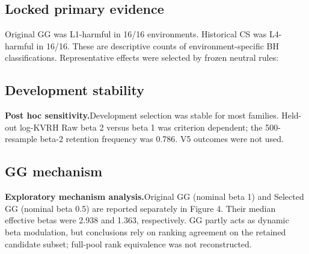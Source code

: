\documentclass[10pt]{article}
\newcommand{\evidencelabel}[1]{\textbf{#1}\enspace}
\begin{document}
\subsection{Locked primary evidence}
Original GG was L1-harmful in 16/16 environments. Historical CS was L4-harmful in 16/16. These are descriptive counts of environment-specific BH classifications. Representative effects were selected by frozen neutral rules:
\begin{center}\end{center}

\subsection{Development stability}
\evidencelabel{Post hoc sensitivity.}Development selection was stable for most families. Held-out log-KVRH Raw beta 2 versus beta 1 was criterion dependent; the 500-resample beta-2 retention frequency was 0.786. V5 outcomes were not used.

\subsection{GG mechanism}
\evidencelabel{Exploratory mechanism analysis.}Original GG (nominal beta 1) and Selected GG (nominal beta 0.5) are reported separately in Figure 4. Their median effective betas were 2.938 and 1.363, respectively. GG partly acts as dynamic beta modulation, but conclusions rely on ranking agreement on the retained candidate subset; full-pool rank equivalence was not reconstructed.
\end{document}
